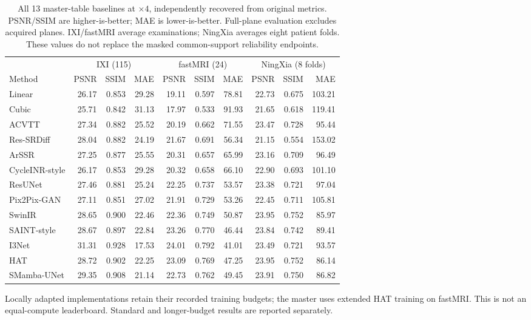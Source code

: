 \begin{table}[t]
\caption{All 13 master-table baselines at $\times4$, independently recovered from original metrics. PSNR/SSIM are higher-is-better; MAE is lower-is-better. Full-plane evaluation excludes acquired planes. IXI/fastMRI average examinations; NingXia averages eight patient folds. These values do not replace the masked common-support reliability endpoints.}
\label{tab:p15-master}\centering\small\setlength{\tabcolsep}{3.7pt}
\begin{tabular}{lrrrrrrrrr}\toprule
&\multicolumn{3}{c}{IXI (115)}&\multicolumn{3}{c}{fastMRI (24)}&\multicolumn{3}{c}{NingXia (8 folds)}\\
Method&PSNR&SSIM&MAE&PSNR&SSIM&MAE&PSNR&SSIM&MAE\\\midrule
Linear & 26.17 & 0.853 & 29.28 & 19.11 & 0.597 & 78.81 & 22.73 & 0.675 & 103.21\\
Cubic & 25.71 & 0.842 & 31.13 & 17.97 & 0.533 & 91.93 & 21.65 & 0.618 & 119.41\\
ACVTT & 27.34 & 0.882 & 25.52 & 20.19 & 0.662 & 71.55 & 23.47 & 0.728 & 95.44\\
Res-SRDiff & 28.04 & 0.882 & 24.19 & 21.67 & 0.691 & 56.34 & 21.15 & 0.554 & 153.02\\
ArSSR & 27.25 & 0.877 & 25.55 & 20.31 & 0.657 & 65.99 & 23.16 & 0.709 & 96.49\\
CycleINR-style & 26.17 & 0.853 & 29.28 & 20.32 & 0.658 & 66.10 & 22.90 & 0.693 & 101.10\\
ResUNet & 27.46 & 0.881 & 25.24 & 22.25 & 0.737 & 53.57 & 23.38 & 0.721 & 97.04\\
Pix2Pix-GAN & 27.11 & 0.851 & 27.02 & 21.91 & 0.729 & 53.26 & 22.45 & 0.711 & 105.81\\
SwinIR & 28.65 & 0.900 & 22.46 & 22.36 & 0.749 & 50.87 & 23.95 & 0.752 & 85.97\\
SAINT-style & 28.67 & 0.897 & 22.84 & 23.26 & 0.770 & 46.44 & 23.84 & 0.742 & 89.41\\
I3Net & 31.31 & 0.928 & 17.53 & 24.01 & 0.792 & 41.01 & 23.49 & 0.721 & 93.57\\
HAT & 28.72 & 0.902 & 22.25 & 23.09 & 0.769 & 47.25 & 23.95 & 0.752 & 86.14\\
SMamba-UNet & 29.35 & 0.908 & 21.14 & 22.73 & 0.762 & 49.45 & 23.91 & 0.750 & 86.82\\
\bottomrule\end{tabular}
\par\smallskip\parbox{.98\textwidth}{\footnotesize Locally adapted implementations retain their recorded training budgets; the master uses extended HAT training on fastMRI. This is not an equal-compute leaderboard. Standard and longer-budget results are reported separately.}
\end{table}
